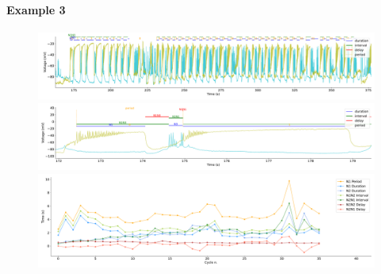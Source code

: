 \paragraph{\large{Example 3}}


\begin{figure}[htbp]
	\centering
	\begin{minipage}[b]{\textwidth}
		\centering
		\includegraphics[width=\textwidth,height=0.1\textheight]{./invariants/data/SUSSEX/CV1a_driven3/images/stim_cv1a3_signal_intervals_zoom.pdf}
		\includegraphics[width=\textwidth]{./invariants/data/SUSSEX/CV1a_driven3/images/stim_cv1a3_signal_intervals_cycle.pdf}
		\includegraphics[width=\textwidth]{./invariants/data/SUSSEX/CV1a_driven3/images/stim_cv1a3_time_cycle.pdf}
	\end{minipage}
	\centering
	\begin{minipage}{0.9\textwidth}
		\begin{minipage}[b]{0.43\textwidth}
			\centering

\end{minipage}
\end{minipage}
\end{figure}
